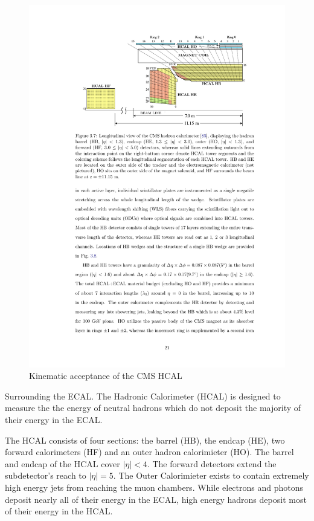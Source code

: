  \begin{figure}
\begin{center}
\includegraphics[width=.95\textwidth]{pics/hcal_diagram}
\end{center}
\caption{Kinematic acceptance of the CMS HCAL}
\label{fig:hcal_diagram}
\end{figure}

Surrounding the ECAL. The Hadronic Calorimeter (HCAL) is designed to measure the the energy of neutral hadrons which do not
deposit the majority of their energy in the ECAL. 

 The HCAL consists of four sections: the barrel (HB), the endcap (HE), two forward calorimeters (HF) and an outer  hadron calorimieter (HO). 
The barrel and endcap of the HCAL cover $|\eta| < 4$. The forward detectors extend the subdetector's reach to $|\eta| =5$. The Outer Calorimieter exists to contain extremely high energy jets from reaching the muon chambers. 
While electrons and photons deposit nearly all of their energy in the ECAL, high energy hadrons deposit most of their energy in the HCAL.

